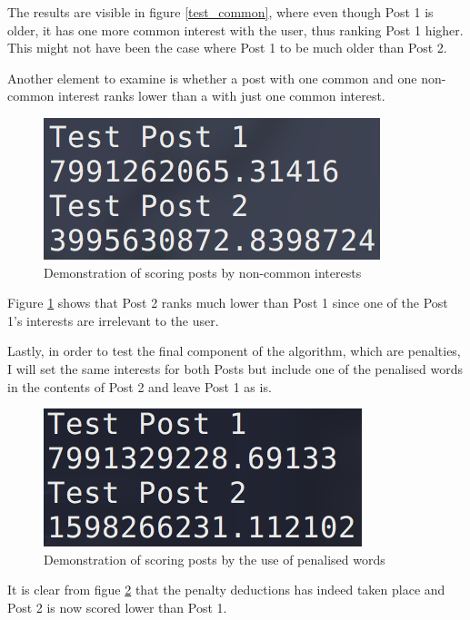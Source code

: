 The results are visible in figure \ref{test_common}, where even though Post 1 is older, it has one more common interest with the user, thus ranking Post 1 higher. This might not have been the case where Post 1 to be much older than Post 2.

Another element to examine is whether a post with one common and one non-common interest ranks lower than a with just one common interest.

\begin{figure}[htbp]
\begin{minipage}[t]{\linewidth}
  \centering
    \includegraphics[scale=1]{Figures/test_non_common}
    \caption{Demonstration of scoring posts by non-common interests}
    \label{test_non_common}
\end{minipage}%
\end{figure}

Figure \ref{test_non_common} shows that Post 2 ranks much lower than Post 1 since one of the Post 1's interests are irrelevant to the user.

Lastly, in order to test the final component of the algorithm, which are penalties, I will set the same interests for both Posts but include one of the penalised words in the contents of Post 2 and leave Post 1 as is.

\begin{figure}[htbp]
\begin{minipage}[t]{\linewidth}
  \centering
    \includegraphics[scale=1]{Figures/test_penalties}
    \caption{Demonstration of scoring posts by the use of penalised words}
    \label{test_penalties}
\end{minipage}%
\end{figure}

It is clear from figue \ref{test_penalties} that the penalty deductions has indeed taken place and Post 2 is now scored lower than Post 1.
